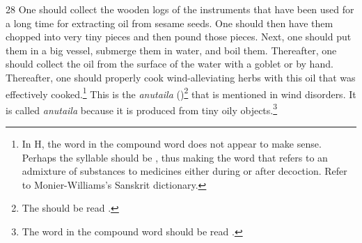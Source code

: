 \begin{translation}
{\begin{tt}
    \item[28]
    One should collect the wooden logs of the instruments that have been used 
    for a long time for extracting oil from sesame seeds. One should then have 
    them chopped into very tiny pieces and then pound those pieces. Next, one 
    should put them in a big vessel, submerge them in water, and boil them. 
    Thereafter, one should collect the oil from the surface of the water with a 
    goblet or by hand. Thereafter, one should properly cook wind-alleviating 
    herbs with this oil that was effectively cooked.\footnote{In H, the word 
     in the compound word 
     does not appear to make sense. 
    Perhaps the syllable  should be , thus making the word 
     that refers to an admixture of substances to medicines 
    either during or after decoction. Refer to Monier-Williams's Sanskrit 
    dictionary.} This is the \textit{anutaila} ()\footnote{The 
     should be read .} that is mentioned in wind disorders. It is 
    called \textit{anutaila} because it is produced from tiny oily 
    objects.\footnote{The word  in the compound word 
     should be read .} 


\end{tt}}
\end{translation}
